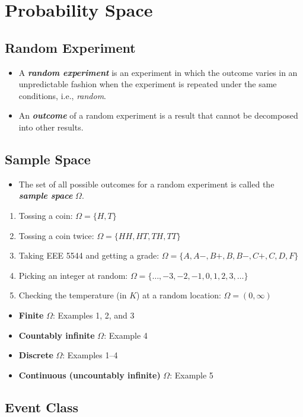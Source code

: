 \section{Probability Space}

\subsection{Random Experiment}

\begin{itemize}
\item A \textit{\textbf{random experiment}} is an experiment in which the outcome varies in an unpredictable fashion when the experiment is repeated under the same conditions, i.e., \textit{random}.
\item An \textit{\textbf{outcome}} of a random experiment is a result that cannot be decomposed into other results.
\end{itemize}

\subsection{Sample Space}

\begin{itemize}
\item The set of all possible outcomes for a random experiment is called the \textit{\textbf{sample space}} $\Omega$.
\end{itemize}

\begin{example}\begin{enumerate}
\item Tossing a coin: $\Omega = \{H,T\}$
\item Tossing a coin twice: $\Omega = \{HH,HT,TH,TT\}$
\item Taking EEE 5544 and getting a grade:
$\Omega = \{A,A -,B+,B,B -,C+,C,D,F\}$
\item Picking an integer at random:
$\Omega = \{\ldots, -3, -2, -1,0,1,2,3,\ldots\}$
\item Checking the temperature (in $K$) at a random location:
$\Omega = (0,\infty)$
\end{enumerate}

\begin{itemize}
\item \textbf{Finite} $\Omega$: Examples 1, 2, and 3
\item \textbf{Countably infinite} $\Omega$: Example 4
\item \textbf{Discrete} $\Omega$: Examples 1--4
\item \textbf{Continuous (uncountably infinite)} $\Omega$: Example 5
\end{itemize}

\end{example}\subsection{Event Class}

